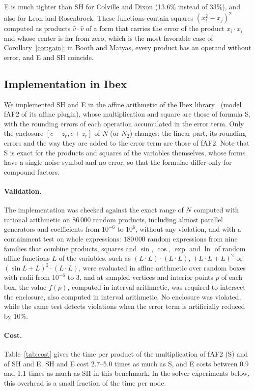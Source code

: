 \documentclass[10pt]{article}
\theoremstyle{definition}
\begin{document}
E is much tighter than SH for Colville and Dixon (13.6\% instead of 33\%), and also for Leon and Rosenbrock. These functions contain squares $(x_i^2-x_j)^2$ computed as products $\hat v\cdot\hat v$ of a form that carries the error of the product $x_i\cdot x_i$ and whose center is far from zero, which is the most favorable case of Corollary~\ref{cor:gain}; in Booth and Matyas, every product has an operand without error, and E and SH coincide.


\subsection{Implementation in Ibex}
\label{sec:ibex}

We implemented SH and E in the affine arithmetic of the Ibex library~\cite{chabert2009,ibexaffine} (model fAF2 of its affine plugin), whose multiplication and square are those of formula S, with the rounding errors of each operation accumulated in the error term. Only the enclosure $[c-z_r,c+z_r]$ of $N$ (or $N_2$) changes: the linear part, its rounding errors and the way they are added to the error term are those of fAF2. Note that S is exact for the products and squares of the variables themselves, whose forms have a single noise symbol and no error, so that the formulae differ only for compound factors.

\paragraph{Validation.} The implementation was checked against the exact range of $N$ computed with rational arithmetic on 86\,000 random products, including almost parallel generators and coefficients from $10^{-6}$ to $10^6$, without any violation, and with a containment test on whole expressions: $180\,000$ random expressions from nine families that combine products, squares and $\sin$, $\cos$, $\exp$ and $\ln$ of random affine functions $L$ of the variables, such as $(L\cdot L)\cdot(L\cdot L)$, $(L\cdot L+L)^2$ or $(\sin L+L)^2\cdot(L\cdot L)$, were evaluated in affine arithmetic over random boxes with radii from $10^{-6}$ to $3$, and at sampled vertices and interior points $p$ of each box, the value $f(p)$, computed in interval arithmetic, was required to intersect the enclosure, also computed in interval arithmetic. No enclosure was violated, while the same test detects violations when the error term is artificially reduced by 10\%.

\paragraph{Cost.} Table~\ref{tab:cost} gives the time per product of the multiplication of fAF2 (S) and of SH and E. SH and E cost 2.7--5.0 times as much as S, and E costs between 0.9 and 1.1 times as much as SH in this benchmark. In the solver experiments below, this overhead is a small fraction of the time per node.
\end{document}

